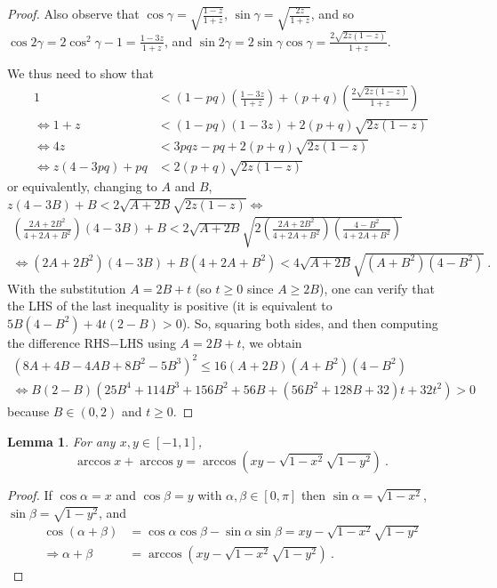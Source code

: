 \documentclass[reqno,hidelinks,11pt]{amsart}
\numberwithin{equation}{section}
\newtheorem{lemma}[theorem]{Lemma}
\begin{document}
\begin{proof}
    Also observe that $\cos\gamma=\sqrt{\frac{1-z}{1+z}}$, $\sin\gamma=\sqrt{\frac{2z}{1+z}}$, and so $\cos2\gamma=2\cos^2\gamma-1=\frac{1-3z}{1+z}$, and $\sin2\gamma=2\sin\gamma\cos\gamma=\frac{2\sqrt{2z(1-z)}}{1+z}$. 

    We thus need to show that
    \begin{align*}
        1 &< (1-pq)\left(\frac{1-3z}{1+z}\right)+(p+q)\left(\frac{2\sqrt{2z(1-z)}}{1+z}\right)\\
       \Leftrightarrow 1+z &< (1-pq)(1-3z)+2(p+q)\sqrt{2z(1-z)}\\
       \Leftrightarrow 4z &< 3pqz-pq+2(p+q)\sqrt{2z(1-z)}\\
       \Leftrightarrow z(4-3pq)+pq &< 2(p+q)\sqrt{2z(1-z)}
    \end{align*}
    or equivalently, changing to $A$ and $B$, $z(4-3B)+B < 2\sqrt{A+2B}\sqrt{2z(1-z)}\Leftrightarrow$
    \begin{align*}
        \left(\frac{2A+2B^2}{4+2A+B^2}\right)(4-3B)+B < 2\sqrt{A+2B}\sqrt{2\left(\frac{2A+2B^2}{4+2A+B^2}\right)\left(\frac{4-B^2}{4+2A+B^2}\right)}\\
        \Leftrightarrow (2A+2B^2)(4-3B)+B(4+2A+B^2) < 4\sqrt{A+2B}\sqrt{(A+B^2)(4-B^2)}~.
    \end{align*}   
    With the substitution $A=2B+t$ (so $t\ge0$ since $A\ge 2B$), one can verify that the LHS of the last inequality is positive (it is equivalent to $5B(4-B^2)+4t(2-B)>0$). So, squaring both sides, and then computing the difference RHS$-$LHS using $A=2B+t$, we obtain
    \begin{align*}
    (8A+4B-4AB+8B^2-5B^3)^2 \le 16(A+2B)(A+B^2)(4-B^2)\\
    \Leftrightarrow B(2-B)(25B^4+114B^3+156B^2+56B + (56B^2+128B+32)t + 32t^2)>0
    \end{align*}
    because $B\in(0,2)$ and $t\ge0$.
\end{proof}

\begin{lemma}\label{lemma: arccos sum}
    For any $x,y\in[-1,1]$,
    \[
    \arccos x+\arccos y=\arccos\left(xy-\sqrt{1-x^2}\sqrt{1-y^2}\right)~.
    \]
\end{lemma}
\begin{proof}
    If $\cos\alpha=x$ and $\cos\beta=y$ with $\alpha,\beta\in[0,\pi]$ then $\sin\alpha=\sqrt{1-x^2}$, $\sin\beta=\sqrt{1-y^2}$, and
    \begin{align*}
        \cos(\alpha+\beta)&=\cos\alpha\cos\beta-\sin\alpha\sin\beta =xy-\sqrt{1-x^2}\sqrt{1-y^2}\\
        \Rightarrow \alpha+\beta&=\arccos\left(xy-\sqrt{1-x^2}\sqrt{1-y^2}\right)~.
    \end{align*}
\end{proof}
\end{document}
